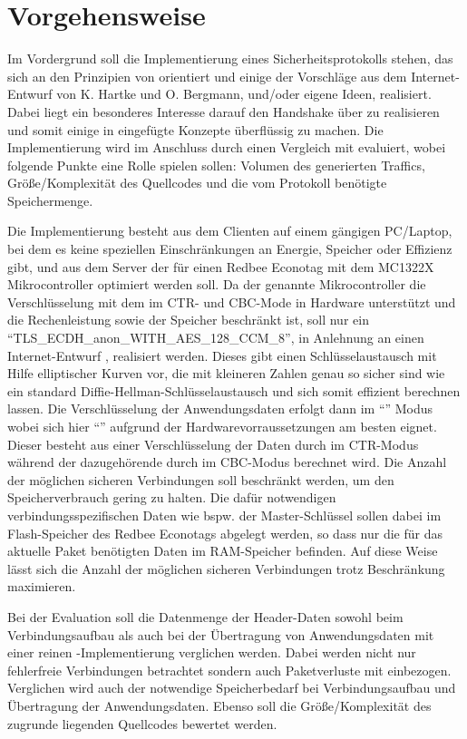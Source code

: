 \chapter{Vorgehensweise}

Im Vordergrund soll die Implementierung eines Sicherheitsprotokolls stehen, das sich an den Prinzipien von  orientiert
und einige der Vorschläge aus dem Internet-Entwurf von K. Hartke und O. Bergmann, und/oder eigene Ideen, realisiert.
Dabei liegt ein besonderes Interesse darauf den Handshake über  zu realisieren und somit einige in  eingefügte Konzepte überflüssig zu machen.
Die Implementierung wird im Anschluss durch einen Vergleich mit  evaluiert, wobei folgende Punkte eine Rolle spielen sollen:
Volumen des generierten Traffics, Größe/Komplexität des Quellcodes und die vom Protokoll benötigte Speichermenge.

Die Implementierung besteht aus dem Clienten auf einem gängigen PC/Laptop, bei dem es keine speziellen Einschränkungen an Energie,
Speicher oder Effizienz gibt, und aus dem Server der für einen Redbee Econotag \cite{econotag} mit dem MC1322X
Mikrocontroller \cite{mc1322x} optimiert werden soll. Da der genannte Mikrocontroller die Verschlüsselung mit dem  im CTR- und CBC-Mode
in Hardware unterstützt und die Rechenleistung sowie der Speicher beschränkt ist, soll nur ein  "`TLS\_ECDH\_anon\_WITH\_AES\_128\_CCM\_8"',
in Anlehnung an einen Internet-Entwurf \cite{draftaesecc}, realisiert werden. Dieses gibt einen Schlüsselaustausch mit Hilfe elliptischer
Kurven vor, die mit kleineren Zahlen genau so sicher sind wie ein standard Diffie-Hellman-Schlüsselaustausch und sich somit effizient berechnen
lassen. Die Verschlüsselung der Anwendungsdaten erfolgt dann im "`"' Modus \cite{rfc5116}
wobei sich hier "`"' \cite{rfc3610} aufgrund der Hardwarevorraussetzungen am besten eignet. Dieser besteht
aus einer Verschlüsselung der Daten durch  im CTR-Modus während der dazugehörende  durch  im CBC-Modus berechnet wird.
Die Anzahl der möglichen sicheren Verbindungen soll beschränkt werden, um den Speicherverbrauch gering zu halten.
Die dafür notwendigen verbindungsspezifischen Daten wie bspw. der Master-Schlüssel sollen dabei im Flash-Speicher des Redbee Econotags
abgelegt werden, so dass nur die für das aktuelle Paket benötigten Daten im RAM-Speicher befinden. Auf diese Weise lässt sich
die Anzahl der möglichen sicheren Verbindungen trotz Beschränkung maximieren.

Bei der Evaluation soll die Datenmenge der Header-Daten sowohl beim Verbindungsaufbau als auch bei der Übertragung von Anwendungsdaten
mit einer reinen -Implementierung verglichen werden. Dabei werden nicht nur fehlerfreie Verbindungen betrachtet sondern auch Paketverluste
mit einbezogen. Verglichen wird auch der notwendige Speicherbedarf bei Verbindungsaufbau und Übertragung der Anwendungsdaten.
Ebenso soll die Größe/Komplexität des zugrunde liegenden Quellcodes bewertet werden.